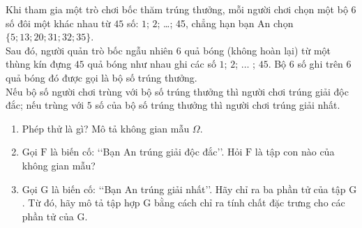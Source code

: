 \begin{vd}%
	Khi tham gia một trò chơi bốc thăm trúng thưởng, mỗi người chơi chọn một bộ $ 6 $ số đôi một khác nhau từ $ 45 $ số: $ 1 $; $ 2 $; \ldots ; 45, chẳng hạn bạn An chọn $ \{5; 13; 20; 31; 32; 35\} $.\\
	Sau đó, người quản trò  bốc ngẫu nhiên $ 6 $ quả bóng (không hoàn lại) từ một thùng kín đựng $ 45 $ quả bóng như nhau ghi các số $ 1 $; $ 2 $; $\ldots$ ; $ 45 $. Bộ $ 6 $ số ghi trên $ 6 $ quả bóng đó được gọi là bộ số trúng thưởng.\\
	Nếu bộ số người chơi trùng với bộ số trúng thưởng thì người chơi trúng giải độc đắc; nếu trùng với $ 5 $ số của bộ số trúng thưởng thì người chơi trúng giải nhất.
	\begin{enumerate}
		\item Phép thử là gì? Mô tả không gian mẫu $ \Omega $.
		\item Gọi $ \mathrm{F} $ là biến cố: \lq\lq Bạn An trúng giải độc đắc\rq\rq. Hỏi $ \mathrm{F} $ là tập con nào của không gian mẫu?
		 \item Gọi $ \mathrm{G} $ là biến cố: \lq\lq Bạn An trúng giải nhất\rq\rq. Hãy chỉ ra ba phần tử của tập $ \mathrm{G} $. Từ đó, hãy mô tả tập hợp $ \mathrm{G} $ bằng cách chỉ ra tính chất đặc trưng cho các phần tử của $ \mathrm{G} $.
	\end{enumerate}
\end{vd}

